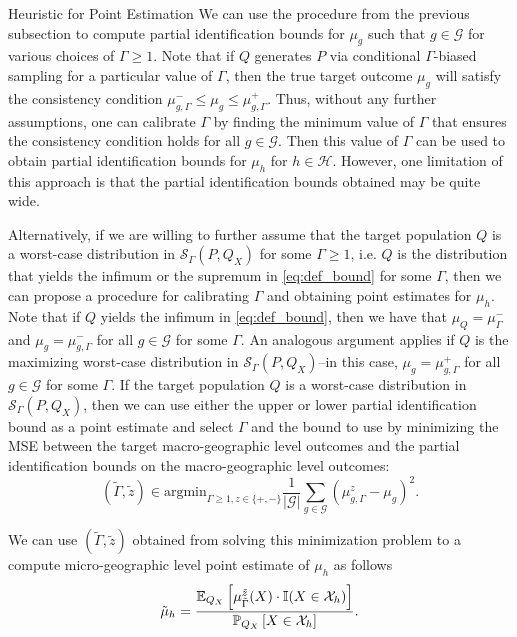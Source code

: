 \begin{subsection}{Heuristic for Point Estimation}
\label{subsec:heuristic}
We can use the procedure from the previous subsection to compute partial identification bounds for $\mu_{g}$ such that $g \in \mathcal{G}$ for various choices of $\Gamma \geq 1.$ Note that if $Q$ generates $P$ via conditional $\Gamma$-biased sampling for a particular value of $\Gamma$, then the true target outcome $\mu_{g}$ will satisfy the consistency condition $\mu_{g, \Gamma}^{-} \leq \mu_{g} \leq \mu_{g, \Gamma}^{+}.$ Thus, without any further assumptions, one can calibrate $\Gamma$ by finding the minimum value of $\Gamma$ that ensures the consistency condition holds for all $g \in \mathcal{G}.$ Then this value of $\Gamma$ can be used to obtain partial identification bounds for $\mu_{h}$ for $h \in \mathcal{H}.$ However, one limitation of this approach is that the partial identification bounds obtained may be quite wide.

Alternatively, if we are willing to further assume that the target population $Q$ is a worst-case distribution in $\mathcal{S}_{\Gamma}(P, Q_{X})$ for some $\Gamma \geq 1$, i.e. $Q$ is the distribution that yields the infimum or the supremum in \eqref{eq:def_bound} for some $\Gamma$, then we can propose a procedure for calibrating $\Gamma$ and obtaining point estimates for $\mu_{h}$. Note that if $Q$ yields the infimum in \eqref{eq:def_bound}, then we have that $\mu_{Q}= \mu_{\Gamma}^{-}$ and $\mu_{g} = \mu_{g, \Gamma}^{-}$ for all $g \in \mathcal{G}$ for some $\Gamma$. An analogous argument applies if $Q$ is the maximizing worst-case distribution in $\mathcal{S}_{\Gamma}(P, Q_{X})$--in this case, $\mu_{g} = \mu_{g, \Gamma}^{+}$ for all $g \in \mathcal{G}$ for some $\Gamma$. If the target population $Q$ is a worst-case distribution in $\mathcal{S}_{\Gamma}(P, Q_{X})$, then we can use either the upper or lower partial identification bound as a point estimate and select $\Gamma$ and the bound to use by minimizing the MSE between the target macro-geographic level outcomes and the partial identification bounds on the macro-geographic level outcomes:
\begin{equation} (\tilde{\Gamma}, \tilde{z}) \in \text{argmin}_{\Gamma \geq 1, z \in \{+, -\}} \frac{1}{|\mathcal{G}|} \sum_{g \in \mathcal{G}} (\mu_{g, \Gamma}^{z} - \mu_{g})^{2}.\end{equation}

We can use $(\tilde{\Gamma}, \tilde{z})$ obtained from solving this minimization problem to a compute micro-geographic level point estimate of $\mu_{h}$ as follows
\begin{equation} \tilde{\mu}_{h} = \frac{\EE[Q_{X}]{\mu_{\tilde{\Gamma}}^{\tilde{z}}(X) \cdot \mathbb{I}(X \in \mathcal{X}_{h})}}{\PP[Q_{X}]{X \in \mathcal{X}_{h}}}.\end{equation}


\end{subsection}

